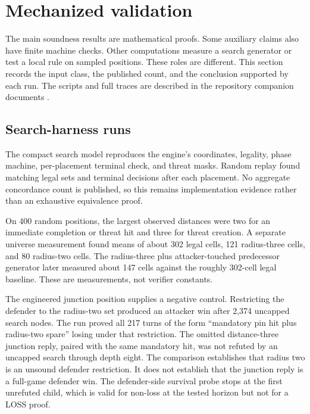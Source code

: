 \section{Mechanized validation}
\label{sec:validation}

The main soundness results are mathematical proofs.  Some auxiliary claims
also have finite machine checks.  Other computations measure a search
generator or test a local rule on sampled positions.  These roles are
different.  This section records the input class, the published count, and
the conclusion supported by each run.  The scripts and full traces are
described in the repository companion documents \cite{hexobot-companions}.

\subsection{Search-harness runs}

The compact search model reproduces the engine's coordinates, legality,
phase machine, per-placement terminal check, and threat masks.  Random replay
found matching legal sets and terminal decisions after each placement.  No
aggregate concordance count is published, so this remains implementation
evidence rather than an exhaustive equivalence proof.

On 400 random positions, the largest observed distances were two for an
immediate completion or threat hit and three for threat creation.  A separate
universe measurement found means of about 302 legal cells, 121 radius-three
cells, and 80 radius-two cells.  The radius-three plus attacker-touched predecessor
generator later measured about 147 cells against the roughly 302-cell legal
baseline.  These are measurements, not verifier constants.

The engineered junction position supplies a negative control.  Restricting
the defender to the radius-two set produced an attacker win after 2,374
uncapped search nodes.  The run proved all 217 turns of the form
``mandatory pin hit plus radius-two spare'' losing under that restriction.
The omitted distance-three junction reply, paired with the same mandatory
hit, was not refuted by an uncapped search through depth eight.  The
comparison establishes that radius two is an unsound defender restriction.
It does not establish that the junction reply is a full-game defender win.
The defender-side survival probe stops at the first unrefuted child, which is
valid for non-loss at the tested horizon but not for a LOSS proof.

